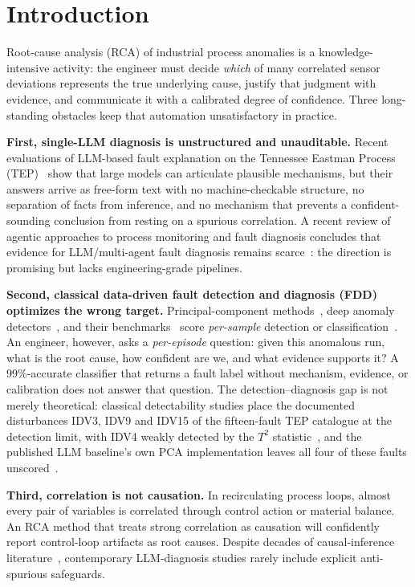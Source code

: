 \documentclass[preprint,10pt]{elsarticle}
\begin{document}
\section{Introduction}
\label{sec:intro}

Root-cause analysis (RCA) of industrial process anomalies is a knowledge-intensive activity: the engineer must decide \emph{which} of many correlated sensor deviations represents the true underlying cause, justify that judgment with evidence, and communicate it with a calibrated degree of confidence. Three long-standing obstacles keep that automation unsatisfactory in practice.

\textbf{First, single-LLM diagnosis is unstructured and unauditable.} Recent evaluations of LLM-based fault explanation on the Tennessee Eastman Process (TEP)~\cite{khan2024faultexplainer} show that large models can articulate plausible mechanisms, but their answers arrive as free-form text with no machine-checkable structure, no separation of facts from inference, and no mechanism that prevents a confident-sounding conclusion from resting on a spurious correlation. A recent review of agentic approaches to process monitoring and fault diagnosis concludes that evidence for LLM/multi-agent fault diagnosis remains scarce~\cite{agentic2026review}: the direction is promising but lacks engineering-grade pipelines.

\textbf{Second, classical data-driven fault detection and diagnosis (FDD) optimizes the wrong target.} Principal-component methods~\cite{kano2002comparison}, deep anomaly detectors~\cite{tuli2022tranad,pozdnyakov2024adversarial}, and their benchmarks~\cite{rieth2017additional} score \emph{per-sample} detection or classification~\cite{qin2012survey}. An engineer, however, asks a \emph{per-episode} question: given this anomalous run, what is the root cause, how confident are we, and what evidence supports it? A 99\%-accurate classifier that returns a fault label without mechanism, evidence, or calibration does not answer that question. The detection--diagnosis gap is not merely theoretical: classical detectability studies place the documented disturbances IDV3, IDV9 and IDV15 of the fifteen-fault TEP catalogue at the detection limit, with IDV4 weakly detected by the $T^2$ statistic~\cite{russell2000delay,chiang2001fault}, and the published LLM baseline's own PCA implementation leaves all four of these faults unscored~\cite{khan2024faultexplainer}.

\textbf{Third, correlation is not causation.} In recirculating process loops, almost every pair of variables is correlated through control action or material balance. An RCA method that treats strong correlation as causation will confidently report control-loop artifacts as root causes. Despite decades of causal-inference literature~\cite{yuan2014root,bauer2007finding}, contemporary LLM-diagnosis studies rarely include explicit anti-spurious safeguards.
\end{document}
